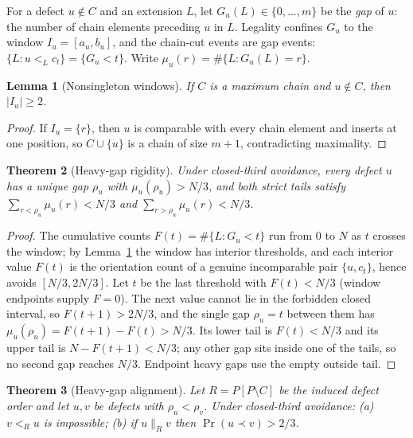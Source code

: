 \documentclass[11pt]{article}
\newtheorem{theorem}{Theorem}[section]
\newtheorem{lemma}[theorem]{Lemma}
\theoremstyle{definition}
\theoremstyle{remark}
\newcommand{\pr}{\operatorname{Pr}}
\begin{document}
For a defect $u\notin C$ and an extension $L$, let $G_u(L)\in\{0,\dots,m\}$ be the
\emph{gap} of $u$: the number of chain elements preceding $u$ in $L$. Legality confines
$G_u$ to the window $I_u=[a_u,b_u]$, and the chain-cut events are gap events:
$\{L:u<_Lc_t\}=\{G_u<t\}$. Write $\mu_u(r)=\#\{L:G_u(L)=r\}$.

\begin{lemma}[Nonsingleton windows]\label{lem:nonsingleton}
If $C$ is a maximum chain and $u\notin C$, then $|I_u|\ge2$.
\end{lemma}

\begin{proof}
If $I_u=\{r\}$, then $u$ is comparable with every chain element and inserts at one
position, so $C\cup\{u\}$ is a chain of size $m+1$, contradicting maximality.
\end{proof}

\begin{theorem}[Heavy-gap rigidity]\label{thm:heavygap}
Under closed-third avoidance, every defect $u$ has a unique gap $\rho_u$ with
$\mu_u(\rho_u)>N/3$, and both strict tails satisfy
$\sum_{r<\rho_u}\mu_u(r)<N/3$ and $\sum_{r>\rho_u}\mu_u(r)<N/3$.
\end{theorem}

\begin{proof}
The cumulative counts $F(t)=\#\{L:G_u<t\}$ run from $0$ to $N$ as $t$ crosses the window;
by Lemma~\ref{lem:nonsingleton} the window has interior thresholds, and each interior
value $F(t)$ is the orientation count of a genuine incomparable pair $\{u,c_t\}$, hence
avoids $[N/3,2N/3]$. Let $t$ be the last threshold with $F(t)<N/3$ (window endpoints
supply $F=0$). The next value cannot lie in the forbidden closed interval, so
$F(t+1)>2N/3$, and the single gap $\rho_u=t$ between them has
$\mu_u(\rho_u)=F(t+1)-F(t)>N/3$. Its lower tail is $F(t)<N/3$ and its upper tail is
$N-F(t+1)<N/3$; any other gap sits inside one of the tails, so no second gap reaches
$N/3$. Endpoint heavy gaps use the empty outside tail. %
\end{proof}

\begin{theorem}[Heavy-gap alignment]\label{thm:alignment}
Let $R=P[P\setminus C]$ be the induced defect order and let $u,v$ be defects with
$\rho_u<\rho_v$. Under closed-third avoidance: (a) $v<_Ru$ is impossible; (b) if
$u\parallel_Rv$ then $\pr(u\prec v)>2/3$.
\end{theorem}
\end{document}
